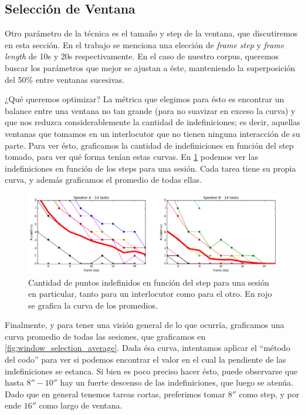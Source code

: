 \subsection{Selección de Ventana}
\label{sec:window_selection}

Otro parámetro de la técnica es el tamaño y step de la ventana, que discutiremos en esta sección. En el trabajo \cite{KOU2008.2} se menciona una elección de \emph{frame step} y \emph{frame length} de 10s y 20s respectivamente. En el caso de nuestro corpus, queremos buscar los parámetros que mejor se ajustan a éste, manteniendo la superposición del 50\% entre ventanas sucesivas.

¿Qué queremos optimizar? La métrica que elegimos para ésto es encontrar un balance entre una ventana no tan grande (para no suavizar en exceso la curva) y que nos reduzca considerablemente la cantidad de indefiniciones; es decir, aquellas ventanas que tomamos en un interlocutor que no tienen ninguna interacción de su parte. Para ver ésto, graficamos la cantidad de indefiniciones en función del step tomado, para ver qué forma tenían estas curvas. En \ref{fig:window_selection_session} podemos ver las indefiniciones en función de los steps para una sesión. Cada tarea tiene su propia curva, y además graficamos el promedio de todas ellas.

\begin{figure}
\centering
\includegraphics[width=15cm]{images/window_selection_for_session.png}
\caption{Cantidad de puntos indefinidos en función del step para una sesión en particular, tanto para un interlocutor como para el otro. En rojo se grafica la curva de los promedios. }
\label{fig:window_selection_session}
\end{figure}

Finalmente, y para tener una visión general de lo que ocurría, graficamos una curva promedio de todas las sesiones, que graficamos en \ref{fig:window_selection_average}. Dada ésa curva, intentamos aplicar el ``método del codo'' para ver si podemos encontrar el valor en el cual la pendiente de las indefiniciones se estanca. Si bien es poco preciso hacer ésto, puede observarse que hasta $8''-10''$ hay un fuerte descenso de las indefiniciones, que luego se atenúa. Dado que en general tenemos tareas cortas, preferimos tomar $8''$ como step, y por ende $16''$ como largo de ventana.

